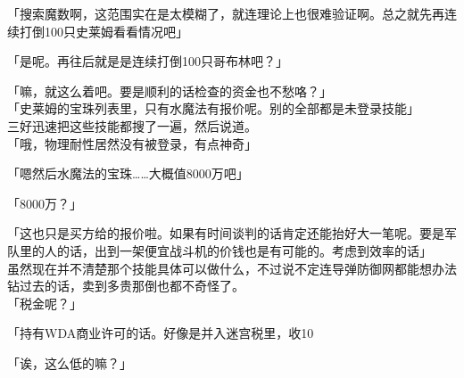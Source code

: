 「搜索魔数啊，这范围实在是太模糊了，就连理论上也很难验证啊。总之就先再连续打倒100只史莱姆看看情况吧」

「是呢。再往后就是是连续打倒100只哥布林吧？」

「嘛，就这么着吧。要是顺利的话检查的资金也不愁咯？」\\

「史莱姆的宝珠列表里，只有水魔法有报价呢。别的全部都是未登录技能」\\

三好迅速把这些技能都搜了一遍，然后说道。\\

「哦，物理耐性居然没有被登录，有点神奇」

「嗯然后水魔法的宝珠……大概值8000万吧」

「8000万？」

「这也只是买方给的报价啦。如果有时间谈判的话肯定还能抬好大一笔呢。要是军队里的人的话，出到一架便宜战斗机的价钱也是有可能的。考虑到效率的话」\\

虽然现在并不清楚那个技能具体可以做什么，不过说不定连导弹防御网都能想办法钻过去的话，卖到多贵那倒也都不奇怪了。\\

「税金呢？」

「持有WDA商业许可的话。好像是并入迷宫税里，收10%

「诶，这么低的嘛？」

